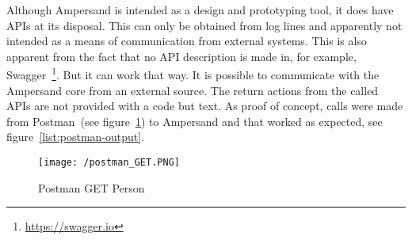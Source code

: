 Although Ampersand is intended as a design and prototyping tool, it does have APIs at its disposal.
This can only be obtained from log lines and apparently not intended as a means of communication from external systems.
This is also apparent from the fact that no API description is made in, for example, Swagger~\footnote{\url{https://swagger.io}}.
But it can work that way.
It is possible to communicate with the Ampersand core from an external source.
The return actions from the called APIs are not provided with a code but text.
As proof of concept, calls were made from Postman~(see figure~\ref{fig:postman-get-person}) to Ampersand and that worked as expected, see figure~\ref{list:postman-output}.
\begin{figure}[ht]
    \centering
    \texttt{[image: /postman\_GET.PNG]}
    \caption{Postman GET Person}
    \label{fig:postman-get-person}
\end{figure}


